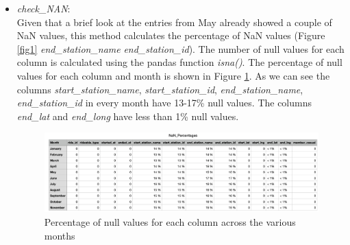 \documentclass[12pt]{article}
\begin{document}
\begin{itemize}
	\item \textit{check\_NAN}:\\
	Given that a brief look at the entries from May already showed a couple of NaN values, this method calculates the percentage of NaN values (Figure \ref{fig1} \textit{end\_station\_name} \textit{end\_station\_id}). The number of null values for each column is calculated using the pandas function \textit{isna()}. The percentage of null values for each column and month is shown in Figure \ref{fig4}. As we can see the columns \textit{start\_station\_name}, \textit{start\_station\_id}, \textit{end\_station\_name}, \textit{end\_station\_id} in every month have 13-17\% null values. The columns \textit{end\_lat} and \textit{end\_long} have less than 1\% null values. 
	
	\begin{figure}[h]
	\includegraphics[width=6.5 in, height = 2 in]{imgNAN.png}
	\caption{Percentage of null values for each column across the various months}
	\label{fig4}
	\end{figure}
	

\end{itemize}
\end{document}
